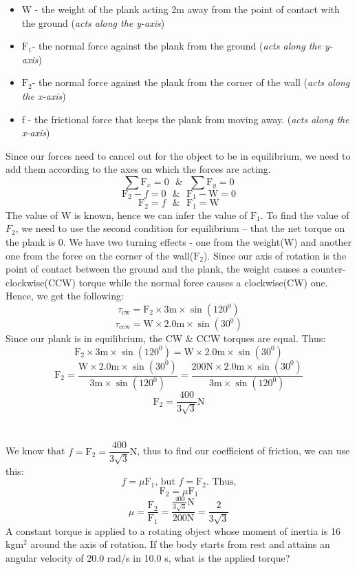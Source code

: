 \documentclass[9pt,addpoints]{exam}
\begin{document}
\begin{questions}
		\begin{itemize}
			\item W - the weight of the plank acting 2m away from the point of contact with the ground (\textit{acts along the y-axis})
			\item $\text{F}_1$- the normal force against the plank from the ground (\textit{acts along the y-axis})
			\item $\text{F}_2$- the normal force against the plank from the corner of the wall (\textit{acts along the x-axis})
			\item f - the frictional force that keeps the plank from moving away. (\textit{acts along the x-axis})
		\end{itemize}
		Since our forces need to cancel out for the object to be in equilibrium, we need to add them according to the axes on which the forces are acting.
		$$\sum\text{F}_x=0 \text{    }\&\text{    }\sum \text{F}_y=0 $$
		$$\text{F}_2-f=0\text{    }\&\text{    }\text{F}_1-\text{W}=0$$
		$$\text{F}_2=f\text{    }\&\text{    }\text{F}_1=\text{W}$$
		The value of W is known, hence we can infer the value of $\text{F}_1$. To find the value of $F_2$, we need to use the second condition for equilibrium -- that the net torque on the plank is 0. We have two turning effects - one from the weight(W) and another one from the force on the corner of the wall($\text{F}_2$). Since our axis of rotation is the point of contact between the ground and the plank, the weight causes a counter-clockwise(CCW) torque while the normal force causes a clockwise(CW) one. Hence, we get the following:
		$$\tau_{\text{cw}}=\text{F}_2\times3\text{m}\times\sin(120^0)$$
		$$\tau_{\text{ccw}}=\text{W}\times2.0\text{m}\times\sin(30^0)$$
		Since our plank is in equilibrium, the CW \& CCW torques are equal. Thus:
		$$\text{F}_2\times3\text{m}\times\sin(120^0)=\text{W}\times2.0\text{m}\times\sin(30^0)$$
		$$\text{F}_2=\dfrac{\text{W}\times2.0\text{m}\times\sin(30^0)}{3\text{m}\times\sin(120^0)}=\dfrac{200\text{N}\times2.0\text{m}\times\sin(30^0)}{3\text{m}\times\sin(120^0)}$$
		$$\text{F}_2=\dfrac{400}{3\sqrt{3}}\text{N}$$ \\ \\
		We know that $f=\text{F}_2=\dfrac{400}{3\sqrt{3}}\text{N}$, thus to find our coefficient of friction, we can use this:
		$$f=\mu\text{F}_1\text{, but }f=\text{F}_2\text{. Thus,}$$
		$$\text{F}_2=\mu\text{F}_1$$
		$$\mu=\dfrac{\text{F}_2}{\text{F}_1}=\dfrac{\frac{400}{3\sqrt{3}}\text{N}}{200\text{N}}=\dfrac{2}{3\sqrt{3}}$$
		\question A constant torque is applied to a rotating object whose moment of inertia is  16 kgm$^2$ around the axis of rotation. If the body starts from rest and attains an angular velocity of 20.0 rad/s in 10.0 s, what is the applied torque? \\ \\

\end{questions}
\end{document}

